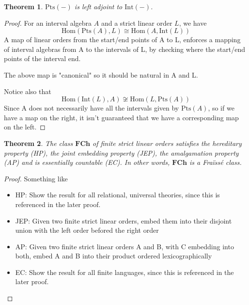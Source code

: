 \documentclass[11pt %
              ]{article}
\newcommand{\finslo}{\textbf{FCh}}
\newcommand{\inter}[1][-]{\text{Int}\left(#1\right)}
\newcommand{\points}[1][-]{\text{Pts}\left(#1\right)}
\theoremstyle{plain}
\newtheorem{thm}{Theorem}%
\theoremstyle{definition}
\theoremstyle{remark}
\begin{document}
\begin{thm}
  $\points$ is left adjoint to $\inter$.
\end{thm}
\begin{proof}
  For an interval algebra $A$ and a strict linear order $L$, we have
  \begin{equation*}
    \text{Hom}(\points[A], L) \cong \text{Hom}(A, \inter[L])
  \end{equation*}
  A map of linear orders from the start/end points of A to L, enforces a mapping of interval
  algebras from A to the intervals of L, by checking where the start/end points of the interval end.

  The above map is "canonical" so it should be natural in A and L.

  Notice also that
  \begin{equation*}
    \text{Hom}(\inter[L],A) \not\cong \text{Hom}(L, \points[A])
  \end{equation*}
  Since A does not necessarily have all the intervals given by $\points[A]$, so if we have a map on
  the right, it isn't guaranteed that we have a corresponding map on the left.
\end{proof}


\begin{thm}
  The class $\finslo$ of finite strict linear orders satisfies the hereditary property (HP),
  the joint embedding property (JEP), the amalgamation property (AP) and is essentially countable
  (EC). In other words, $\finslo$ is a Fraïssé class.
\end{thm}
\begin{proof}
  Something like
  \begin{itemize}
    \item HP: Show the result for all relational, universal theories, since this is referenced in
      the later proof.
    \item JEP: Given two finite strict linear orders, embed them into their disjoint union with
      the left order befored the right order
    \item AP: Given two finite strict linear orders A and B, with C embedding into both,
      embed A and B into their product ordered lexicographically
    \item EC: Show the result for all finite languages, since this is referenced in the later proof.
  \end{itemize}
\end{proof}
\end{document}
